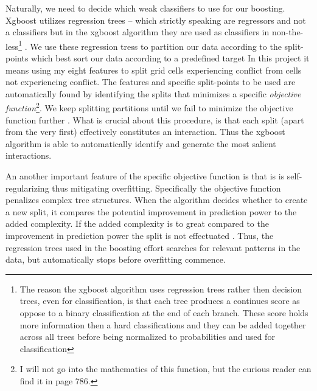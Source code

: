 \documentclass[a4paper]{article}
\begin{document}
Naturally, we need to decide which weak classifiers to use for our boosting. Xgboost utilizes regression trees -- which strictly speaking are regressors and not a classifiers but in the xgboost algorithm they are used as classifiers in non-the-less\footnote{The reason the xgboost algorithm uses regression trees rather then decision trees, even for classification, is that each tree produces a continues score as oppose to a binary classification at the end of each branch. These score holds more information then a hard classifications and they can be added together across all trees before being normalized to probabilities and used for classification} \citep[786]{Chen_2016}. We use these regression tress to partition our data according to the split-points which best sort our data according to a predefined target \citep[786]{Chen_2016} In this project it means using my eight features to split grid cells experiencing conflict from cells not experiencing conflict. The features and specific split-points to be used are automatically found by identifying the splits that minimizes a specific \emph{objective function}\footnote{I  will not go into the mathematics of this function, but the curious reader can find it in \cite{Chen_2016} page 786.}\citep[786]{Chen_2016}. We keep splitting partitions until we fail to minimize the objective function further \citep[786]{Chen_2016}. What is crucial about this procedure, is that each split (apart from the very first) effectively constitutes an interaction. Thus the xgboost algorithm is able to automatically identify and generate the most salient interactions.\par

An another important feature of the specific objective function is that is is self-regularizing thus mitigating overfitting. Specifically the objective function penalizes complex tree structures. When the algorithm decides whether to create a new split, it compares the potential improvement in prediction power to the added complexity. If the added complexity is to great compared to the improvement in prediction power the split is not effectuated \cite[787-791]{Chen_2016}. Thus, the regression trees used in the boosting effort searches for relevant patterns in the data, but automatically stops before overfitting commence.\par
\end{document}
